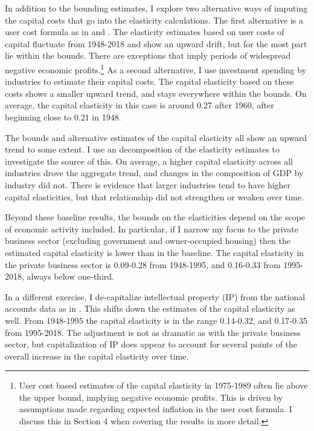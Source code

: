\documentclass[11pt]{article}
\begin{document}
In addition to the bounding estimates, I explore two alternative ways of imputing the capital costs that go into the elasticity calculations. The first alternative is a user cost formula \citep{halljorg1967} as in \cite{Barkai000} and \cite{rognlie2015}. The elasticity estimates based on user costs of capital fluctuate from 1948-2018 and show an upward drift, but for the most part lie within the bounds. There are exceptions that imply periods of widespread negative economic profits.\footnote{User cost based estimates of the capital elasticity in 1975-1989 often lie above the upper bound, implying negative economic profits. This is driven by assumptions made regarding expected inflation in the user cost formula. I discuss this in Section 4 when covering the results in more detail.} As a second alternative, I use investment spending by industries to estimate their capital costs. The capital elasticity based on these costs shows a smaller upward trend, and stays everywhere within the bounds. On average, the capital elasticity in this case is around 0.27 after 1960, after beginning close to 0.21 in 1948. 

The bounds and alternative estimates of the capital elasticity all show an upward trend to some extent. I use an \cite{op1996} decomposition of the elasticity estimates to investigate the source of this. On average, a higher capital elasticity across all industries drove the aggregate trend, and changes in the composition of GDP by industry did not. There is evidence that larger industries tend to have higher capital elasticities, but that relationship did not strengthen or weaken over time.

Beyond these baseline results, the bounds on the elasticities depend on the scope of economic activity included. In particular, if I narrow my focus to the private business sector (excluding government and owner-occupied housing) then the estimated capital elasticity is lower than in the baseline. The capital elasticity in the private business sector is 0.09-0.28 from 1948-1995, and 0.16-0.33 from 1995-2018, always below one-third. 

In a different exercise, I de-capitalize intellectual property (IP) from the national accounts data as in \cite{ksz2020}. This shifts down the estimates of the capital elasticity as well. From 1948-1995 the capital elasticity is in the range 0.14-0.32, and 0.17-0.35 from 1995-2018. The adjustment is not as dramatic as with the private business sector, but capitalization of IP does appear to account for several points of the overall increase in the capital elasticity over time. 
\end{document}
